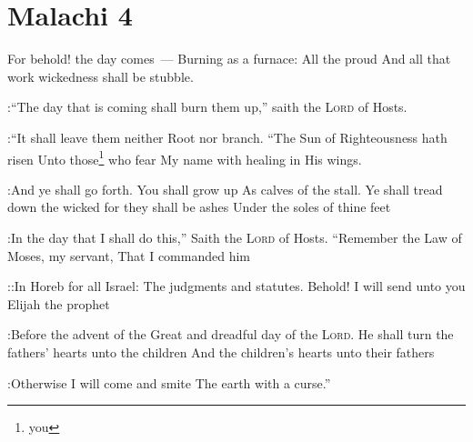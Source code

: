 \section{Malachi 4}\label{Malachi 4}
\begin{enumerate}
     For behold! the day comes~--- Burning as a furnace: All the proud And all that work wickedness shall be stubble.

:``The day that is coming shall burn them up,'' saith the \textsc{Lord} of Hosts.

:``It shall leave them neither Root nor branch.%
     ``The Sun of Righteousness hath risen Unto those\footnote{you} who fear My name with healing in His wings.

:And ye shall go forth. You shall grow up As calves of the stall.%
     Ye shall tread down the wicked for they shall be ashes Under the soles of thine feet

:In the day that I shall do this,'' Saith the \textsc{Lord} of Hosts.%
     ``Remember the Law of Moses, my servant, That I commanded him

::In Horeb for all Israel: The judgments and statutes.%
     Behold! I will send unto you Elijah the prophet

:Before the advent of the Great and dreadful day of the \textsc{Lord}.%
     He shall turn the fathers' hearts unto the children And the children's hearts unto their fathers

:Otherwise I will come and smite The earth with a curse.''%
\end{enumerate}
